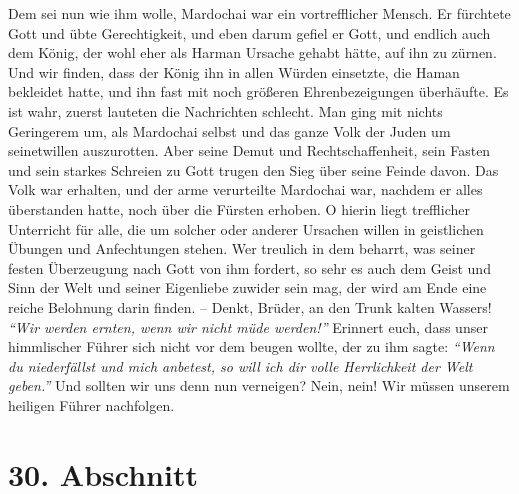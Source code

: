 Dem sei nun wie ihm wolle, Mardochai war ein vortrefflicher Mensch. Er fürchtete
Gott und übte Gerechtigkeit, und eben darum gefiel er Gott, und endlich auch dem
König, der wohl eher als Harman Ursache gehabt hätte, auf ihn zu zürnen. Und
wir finden, dass der König ihn in allen Würden einsetzte, die Haman bekleidet
hatte, und ihn fast mit noch größeren Ehrenbezeigungen überhäufte. Es ist wahr,
zuerst lauteten die Nachrichten schlecht. Man ging mit nichts Geringerem um, als
Mardochai selbst und das ganze Volk der Juden um seinetwillen auszurotten. Aber
seine Demut und Rechtschaffenheit, sein Fasten und sein starkes
Schreien zu
Gott trugen den Sieg über seine Feinde davon. Das Volk war erhalten, und der
arme
verurteilte Mardochai war, nachdem er alles überstanden hatte, noch über die
Fürsten erhoben. O hierin liegt trefflicher Unterricht für alle, die um solcher
oder anderer Ursachen willen in geistlichen Übungen und Anfechtungen stehen.
Wer treulich in dem beharrt, was seiner festen Überzeugung
nach Gott von ihm
fordert, so sehr es auch dem Geist und Sinn der
Welt und seiner Eigenliebe
zuwider sein mag, der wird am Ende eine reiche Belohnung darin
finden. -- Denkt,
Brüder, an den Trunk kalten Wassers!
\textit{"`Wir werden ernten, wenn wir nicht müde
werden!"'}
Erinnert euch, dass unser himmlischer Führer sich nicht vor dem
beugen
wollte, der zu ihm sagte:
\textit{"`Wenn du niederfällst und mich anbetest, so will ich
dir volle Herrlichkeit der Welt geben."'}
Und sollten wir
uns denn nun verneigen? Nein, nein! Wir müssen unserem heiligen Führer
nachfolgen. 

\section{30. Abschnitt} \label{kap9_ab30}

